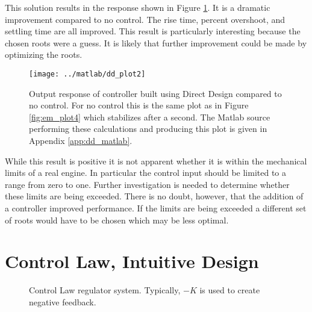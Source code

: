 \documentclass{article}
\begin{document}
This solution results in the response shown in Figure \ref{fig:dd_plot2}.
It is a dramatic improvement compared to no control.
The rise time, percent overshoot, and settling time are all improved.
This result is particularly interesting because the chosen roots were a guess.
It is likely that further improvement could be made by optimizing the roots.

\begin{figure}[htbp!]
\begin{center}
\texttt{[image: ../matlab/dd\_plot2]}
\end{center}
\caption{Output response of controller built using Direct Design
compared to no control.  For no control this is the same plot
as in Figure \ref{fig:em_plot4} which stabilizes after a second.
The Matlab source performing these calculations and producing this
plot is given in Appendix \ref{app:dd_matlab}.}
\label{fig:dd_plot2}
\end{figure}

While this result is positive it is not apparent whether it is within
the mechanical limits of a real engine.
In particular the control input should be limited to a range from zero to one.
Further investigation is needed to determine whether these limits
are being exceeded.
There is no doubt, however, that the addition of a controller
improved performance.
If the limits are being exceeded a different set of roots would have to
be chosen which may be less optimal.


\clearpage
\section{Control Law, Intuitive Design}

\begin{figure}[hpb!]
\begin{center}


\end{center}

\caption{Control Law regulator system.
Typically, $-K$ is used to create negative feedback.}
\label{fig:clid01}
\end{figure}
\end{document}
